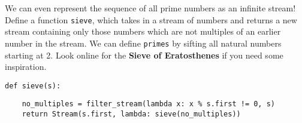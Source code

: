 \question We can even represent the sequence of all prime numbers as an
infinite stream!
Define a function \lstinline$sieve$, which takes in a stream of numbers and
returns a new stream containing only those numbers which are not multiples of
an earlier number in the stream.
We can define \lstinline$primes$ by sifting all natural numbers starting at 2.
Look online for the \textbf{Sieve of Eratosthenes} if you need some inspiration.

\begin{lstlisting}
def sieve(s):
\end{lstlisting}
\begin{solution}[2cm]
\begin{lstlisting}
    no_multiples = filter_stream(lambda x: x % s.first != 0, s)
    return Stream(s.first, lambda: sieve(no_multiples))
\end{lstlisting}
\end{solution}
